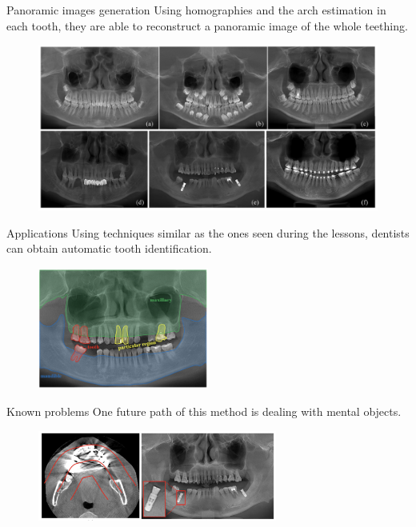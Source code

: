 \begin{frame}{\secname}{Panoramic images generation}
    Using homographies and the arch estimation in each tooth, they are able to reconstruct a panoramic image of the whole teething.
    \begin{figure}
        \includegraphics[width=\textwidth]{img/dental_pano}
    \end{figure}
\end{frame}

\begin{frame}{\secname}{Applications}
    Using techniques similar as the ones seen during the lessons, dentists can obtain automatic tooth identification.
    \begin{figure}
        \includegraphics[width=0.5\textwidth]{img/dental_segmentation}
    \end{figure}
\end{frame}

\begin{frame}{\secname}{Known problems}
    One future path of this method is dealing with mental objects.
    \begin{figure}
        \includegraphics[width=0.7\textwidth]{img/dental_method_problems}
    \end{figure}
\end{frame}
